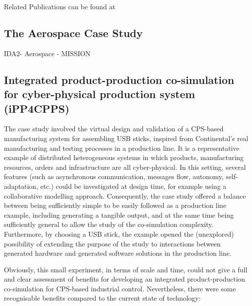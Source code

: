 Related Publications can be found at~\cite{Larsen&16d}

\subsection{The Aerospace Case Study} 
IDA2- Aerospace - MISSION


\subsection{Integrated product-production co-simulation for cyber-physical production system (iPP4CPPS) } \label{sec:IPP4CPPS}

The case study involved the virtual design and validation of a CPS-based manufacturing system for assembling USB sticks, inspired from Continental's real manufacturing and testing processes in a production line. It is a representative example of distributed heterogeneous systems in which products, manufacturing resources, orders and infrastructure are all cyber-physical. In this setting, several features (such as asynchronous communication, messages flow, autonomy, self-adaptation, etc.) could be investigated at design time, for example using a collaborative modelling approach. Consequently, the case study offered a balance between being sufficiently simple to be easily followed as a production line example, including generating a tangible output, and at the same time being sufficiently general to allow the study of the co-simulation complexity. Furthermore, by choosing a USB stick, the example opened the (unexplored) possibility of extending the purpose of the study to interactions between generated hardware and generated software solutions in the production line.

Obviously, this small experiment, in terms of scale and time, could not give a full and clear assessment of benefits for developing an integrated product-production co-simulation for CPS-based industrial control. Nevertheless, there were some recognisable benefits compared to the current state of technology:

